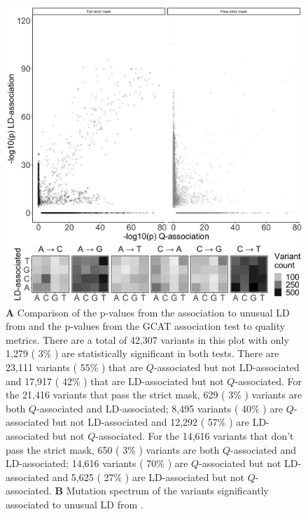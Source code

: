 \documentclass[9pt,article]{template}
\begin{document}
\begin{figure}[tbp]
\centering
\includegraphics[width=13cm,keepaspectratio]{Mafessoni_MutSpect.jpg}
\caption{ \textbf{A} Comparison of the p-values from the association to unusual LD from \cite{mafessoni2018turning} and the p-values from the GCAT association test to quality metrics.
There are a total of 42,307 variants in this plot with only 1,279 ( 3\% ) are statistically significant in both tests.
There are 23,111  variants ( 55\% ) that are $Q$-associated but not LD-associated and 17,917 ( 42\% ) that are LD-associated but not $Q$-associated.
For the 21,416 variants that pass the strict mask, 629 ( 3\% ) variants are both $Q$-associated and LD-associated; 8,495 variants ( 40\% ) are $Q$-associated but not LD-associated and 12,292 ( 57\% ) are LD-associated but not $Q$-associated.
For the 14,616 variants that don't pass the strict mask, 650 ( 3\% ) variants are both $Q$-associated and LD-associated; 14,616 variants ( 70\% ) are $Q$-associated but not LD-associated and 5,625 ( 27\% ) are LD-associated but not $Q$-associated.
\textbf{B} Mutation spectrum of the variants significantly associated to unusual LD from \cite{mafessoni2018turning}. }  
\label{Mafessoni_MutSpect}
\end{figure}
\end{document}
